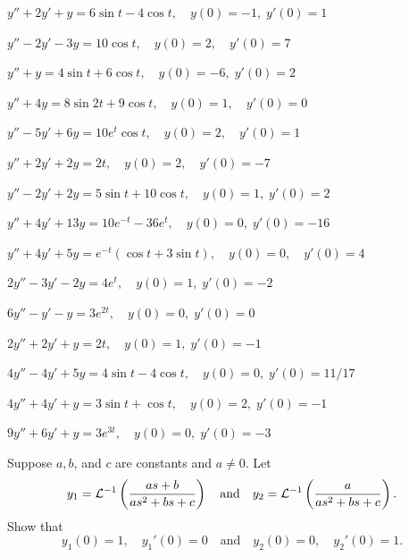 \begin{exerciselist}
\item\label{exer:8.3.23}$y''+2y'+y=6\sin t-4\cos t, \quad  y(0)=-1,\;
y'(0)=1$
\item\label{exer:8.3.24}$y''-2y'-3y=10\cos t, \quad  y(0)=2,\quad y'(0)=7$
\item\label{exer:8.3.25}$y''+y=4\sin t+6\cos t, \quad  y(0)=-6,\;
y'(0)=2$
\item\label{exer:8.3.26}$y''+4y=8\sin2t+9\cos t, \quad  y(0)=1,\quad y'(0)=0$
\item\label{exer:8.3.27}$y''-5y'+6y=10e^t\cos t, \quad  y(0)=2,\quad y'(0)=1$
\item\label{exer:8.3.28}$y''+2y'+2y=2t, \quad  y(0)=2,\quad y'(0)=-7$
\item\label{exer:8.3.29}$y''-2y'+2y=5\sin t+10\cos t, \quad  y(0)=1,\;
y'(0)=2$
\item\label{exer:8.3.30}$y''+4y'+13y=10e^{-t}-36e^t, \quad  y(0)=0,\;
y'(0)=-16$
\item\label{exer:8.3.31}$y''+4y'+5y=e^{-t}(\cos t+3\sin t), \quad
y(0)=0,\quad y'(0)=4$

\item\label{exer:8.3.32}$2y''-3y'-2y=4e^t, \quad   y(0)=1,\;  y'(0)=-2$

\item\label{exer:8.3.33}$6y''-y'-y=3e^{2t}, \quad   y(0)=0,\;  y'(0)=0$

\item\label{exer:8.3.34}$2y''+2y'+y=2t, \quad   y(0)=1,\;  y'(0)=-1$

\item\label{exer:8.3.35}$4y''-4y'+5y=4\sin t-4\cos t, \quad   y(0)=0,\;  y'(0)=11/17$

\item\label{exer:8.3.36}$4y''+4y'+y=3\sin t+\cos t, \quad   y(0)=2,\;  y'(0)=-1$

\item\label{exer:8.3.37}$9y''+6y'+y=3e^{3t}, \quad   y(0)=0,\;  y'(0)=-3$

\item\label{exer:8.3.38}Suppose $a,b$, and $c$ are constants and $a\ne0$.  Let
\[
y_1={\mathcal L}^{-1}\left(\frac{as+b}{as^2+bs+c}\right)\quad\text{and}\quad 
y_2={\mathcal L}^{-1}\left(\frac{a}{as^2+bs+c}\right).
\]
Show that
\[
y_1(0)=1,\quad y_1'(0)=0\quad\text{and}\quad  y_2(0)=0,\quad y_2'(0)=1.
\]

\end{exerciselist}


